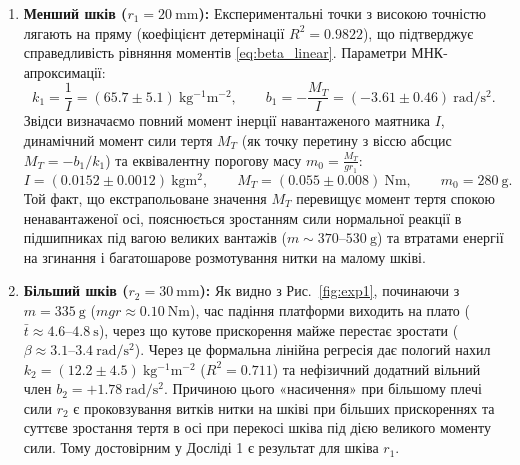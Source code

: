 \documentclass[ukrainian]{ucaphyslab}
\begin{document}
\begin{enumerate}
  \item \textbf{Менший шків ($r_1 = \SI{20}{\milli\meter}$):} Експериментальні точки з високою точністю лягають на пряму (коефіцієнт детермінації $R^2 = 0.9822$), що підтверджує справедливість рівняння моментів \eqref{eq:beta_linear}. Параметри МНК-апроксимації:
  \begin{equation*}
    k_1 = \frac{1}{I} = (\num{65.7} \pm \num{5.1})\ \si{\kilogram^{-1}\meter^{-2}}, \qquad b_1 = -\frac{M_T}{I} = (\num{-3.61} \pm \num{0.46})\ \si{\radian\per\second\squared}.
  \end{equation*}
  Звідси визначаємо повний момент інерції навантаженого маятника $I$, динамічний момент сили тертя $M_T$ (як точку перетину з віссю абсцис $M_T = -b_1/k_1$) та еквівалентну порогову масу $m_0 = \frac{M_T}{g r_1}$:
  \begin{equation}
    I = (\num{0.0152} \pm \num{0.0012})\ \si{\kilogram\meter\squared}, \qquad M_T = (\num{0.055} \pm \num{0.008})\ \si{\newton\meter}, \qquad m_0 = \SI{280}{\gram}.
  \end{equation}
  Той факт, що екстрапольоване значення $M_T$ перевищує момент тертя спокою ненавантаженої осі, пояснюється зростанням сили нормальної реакції в підшипниках під вагою великих вантажів ($m \sim 370\text{--}530\ \si{\gram}$) та втратами енергії на згинання і багатошарове розмотування нитки на малому шківі.

  \item \textbf{Більший шків ($r_2 = \SI{30}{\milli\meter}$):} Як видно з Рис.~\ref{fig:exp1}, починаючи з $m = \SI{335}{\gram}$ ($mgr \approx \SI{0.10}{\newton\meter}$), час падіння платформи виходить на плато ($\bar{t} \approx 4.6\text{--}4.8\ \si{\second}$), через що кутове прискорення майже перестає зростати ($\beta \approx 3.1\text{--}3.4\ \si{\radian\per\second\squared}$). Через це формальна лінійна регресія дає пологий нахил $k_2 = (\num{12.2} \pm \num{4.5})\ \si{\kilogram^{-1}\meter^{-2}}$ ($R^2 = 0.711$) та нефізичний додатний вільний член $b_2 = +1.78\ \si{\radian\per\second\squared}$. Причиною цього «насичення» при більшому плечі сили $r_2$ є проковзування витків нитки на шківі при більших прискореннях та суттєве зростання тертя в осі при перекосі шківа під дією великого моменту сили. Тому достовірним у Досліді 1 є результат для шківа $r_1$.
\end{enumerate}
\end{document}
